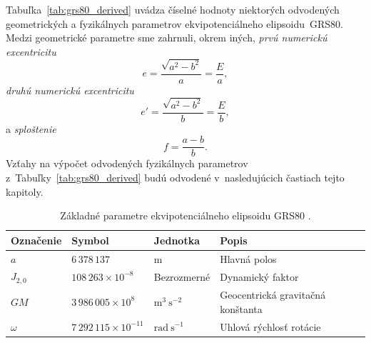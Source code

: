 \documentclass[a4paper,12pt]{book}
\begin{document}
Tabuľka~\ref{tab:grs80_derived} uvádza číselné hodnoty niektorých odvodených geometrických 
a fyzikálnych parametrov ekvipotenciálneho elipsoidu~GRS80.  Medzi geometrické 
parametre sme zahrnuli, okrem iných, \emph{prvú numerickú excentricitu}
%
\begin{equation}
\label{eq:1st_eccentricity}
e = \frac{\sqrt{a^2 - b^2}}{a} = \frac{E}{a}{,}
\end{equation}
%
\emph{druhú numerickú excentricitu}
%
\begin{equation}
\label{eq:2nd_eccentricity}
e' = \frac{\sqrt{a^2 - b^2}}{b} = \frac{E}{b}{,}
\end{equation}
%
a \emph{sploštenie}
%
\begin{equation}
\label{eq:flattening}
f = \frac{a - b}{b}{.}
\end{equation}
%
Vzťahy na výpočet odvodených fyzikálnych parametrov 
z~Tabuľky~\ref{tab:grs80_derived} budú odvodené v~nasledujúcich častiach tejto 
kapitoly.

\begin{table}
\begin{center}
\caption{Základné parametre ekvipotenciálneho elipsoidu GRS80 
\parencite{GRS80}.}
\label{tab:grs80_fundamental}
\small
\begin{tabular}{l l l l}
\hline
Označenie & Symbol & Jednotka & Popis\\
\hline
$a$       & $6\,378\,137$ & m & Hlavná polos\\
$J_{2,0}$ & $108\,263 \times 10^{-8}$ & Bezrozmerné & Dynamický faktor\\
$GM$ & $3\,986\,005 \times 10^8$ & $\mathrm{m}^3 \ \mathrm{s}^{-2}$ 
& Geocentrická gravitačná konštanta\\
$\omega$ & $7\,292\,115 \times 10^{-11}$ & $\mathrm{rad} \ \mathrm{s}^{-1}$ 
& Uhlová rýchlosť rotácie\\
\hline
\end{tabular}
\end{center}
\end{table}
\end{document}
